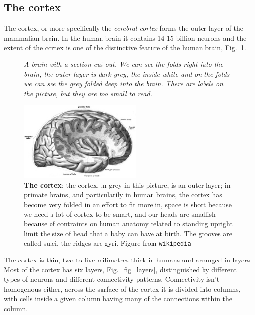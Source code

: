 \documentclass[12pt]{article}
\begin{document}
\subsection*{The cortex}

The cortex, or more specifically the \textsl{cerebral cortex} forms
the outer layer of the mammalian brain. In the human brain it contains
14-15 billion neurons and the extent of the cortex is one of the
distinctive feature of the human brain, Fig.~\ref{fig_cortex}. 

\begin{figure}[tbhp]
{\textsl{A brain with a section cut out. We can see the folds right into the brain, the outer layer is dark grey, the inside white and on the folds we can see the grey folded deep into the brain. There are labels on the picture, but they are too small to read.}}
{
  \begin{center}
\includegraphics[width=6cm]{cortex.png}
  \end{center}
  }
  \caption{\textbf{The cortex}; the cortex, in grey in this picture,
    is an outer layer; in primate brains, and particularily in human
    brains, the cortex has become very folded in an effort to fit more
    in, space is short because we need a lot of cortex to be smart,
    and our heads are smallish because of contraints on human anatomy
    related to standing upright limit the size of head that a baby can
    have at birth. The grooves are called sulci, the ridges are gyri. Figure from \texttt{wikipedia}\label{fig_cortex}}
\end{figure}

The cortex is thin, two to five milimetres thick in humans and
arranged in layers. Most of the cortex has six layers, Fig.~\ref{fig_layers}, distinguished by
different types of neurons and different connectivity
patterns. Connectivity isn't homogenous either, across the surface of
the cortex it is divided into columns, with cells inside a given column having many of the connections within the column.
\end{document}
